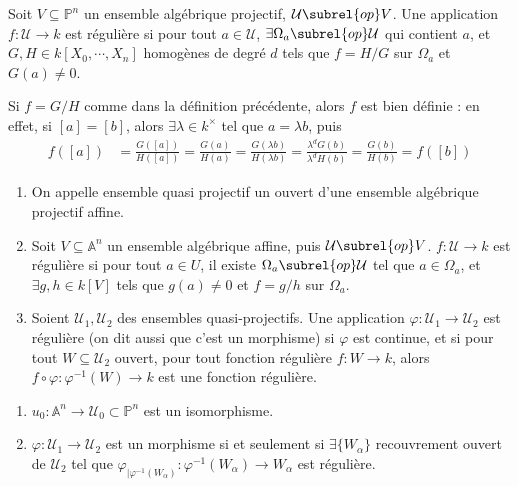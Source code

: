         \begin{defi}
            Soit $V \subseteq \mathbb{P}^n$ un ensemble algébrique projectif, $\mathcal{U} \subrel{op} V$. Une application $f : \mathcal{U} \to k$ est régulière si pour tout $a \in \mathcal{U}$, $\exists \Omega_a \subrel{op} \mathcal{U}$ qui contient $a$, et $G,H \in k[X_0, \cdots, X_n]$ homogènes de degré $d$ tels que $f = H/G$ sur $\Omega_a$ et $G(a) \neq 0$.
        \end{defi}
        \begin{remq}
            Si $f = G/H$ comme dans la définition précédente, alors $f$ est bien définie : en effet, si $[a] = [b]$, alors $\exists \lambda \in k^\times$ tel que $a = \lambda b$, puis
            \begin{align*}
                f([a]) &= \frac{G([a])}{H([a])} = \frac{G(a)}{H(a)} = \frac{G(\lambda b)}{H(\lambda b)} = \frac{\lambda^d G(b)}{\lambda^d H(b)} = \frac{G(b)}{H(b)} = f([b])
            \end{align*}
        \end{remq}
        \begin{defi}
            \begin{enumerate}
                \item On appelle ensemble quasi projectif un ouvert d'une ensemble algébrique projectif affine.
                \item Soit $V \subseteq \mathbb{A}^n$ un ensemble algébrique affine, puis $\mathcal{U} \subrel{op} V$. $f : \mathcal{U} \to k$ est régulière si pour tout $a \in U$, il existe $\Omega_a \subrel{op} \mathcal{U}$ tel que $a \in \Omega_a$, et $\exists g,h \in k[V]$ tels que $g(a) \neq 0$ et $f = g/h$ sur $\Omega_a$. 
                \item Soient $\mathcal{U}_1, \mathcal{U}_2$ des ensembles quasi-projectifs. Une application $\varphi : \mathcal{U}_1 \to \mathcal{U}_2$ est régulière (on dit aussi que c'est un morphisme) si $\varphi$ est continue, et si pour tout $W \subseteq \mathcal{U}_2$ ouvert, pour tout fonction régulière $f : W \to k$, alors $f \circ \varphi : \varphi^{-1}(W) \to k$ est une fonction régulière. 
            \end{enumerate}
        \end{defi}
        \begin{exo}
            \begin{enumerate}
                \item $u_0 : \mathbb{A}^n \to \mathcal{U}_0 \subset \mathbb{P}^n$ est un isomorphisme.
                \item $\varphi : \mathcal{U}_1 \to \mathcal{U}_2$ est un morphisme si et seulement si $\exists \{W_\alpha\}$ recouvrement ouvert de $\mathcal{U}_2$ tel que $\varphi_{|\varphi^{-1}(W_\alpha)} : \varphi^{-1}(W_\alpha) \to W_\alpha$ est régulière.
            \end{enumerate}
        \end{exo}
